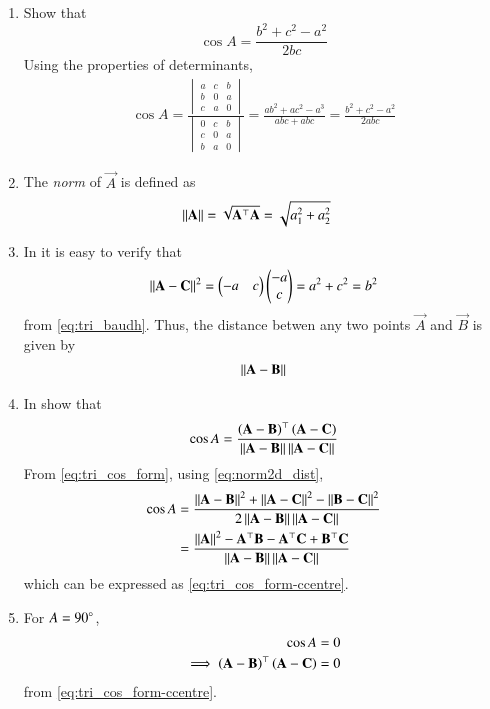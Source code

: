 \begin{enumerate}[label=\thesection.\arabic*.,ref=\thesection.\theenumi]
\item Show that 
\begin{equation}
\label{eq:tri_cos_form}
\cos A = \frac{b^2+c^2-a^2}{2bc}
\end{equation}
%
\solution 
Using the properties of determinants,
%
\begin{align}
\cos A = \frac{
\begin{vmatrix}
a & c & b \\
b & 0 & a \\
c & a & 0
\end{vmatrix}
	}
	{
\begin{vmatrix}
0 & c & b \\
c & 0 & a \\
b & a & 0
\end{vmatrix}
	}
	=\frac{ab^2 + ac^2 - a^3}{abc + abc} 
= \frac{b^2 + c^2 - a^2}{2abc}
\end{align}
\item The {\em norm} of $\vec{A}$ is defined as
\begin{align}
  \label{eq:norm2d}
	\left\lVert\mathbf{A}\right\rVert 
  &= \sqrt{\mathbf{A}^{\top} \mathbf{A}}= \sqrt{a_1^2+a_2^2}
\end{align}
\item In 
it is easy to verify that 
\begin{align}
\left\lVert\mathbf{A}-\mathbf{C}\right\rVert^2  
  = \begin{pmatrix}-a & c\end{pmatrix} \begin{pmatrix}-a \\ c\end{pmatrix}
= a^2 + c^2 = b^2
\end{align}
from 
	\eqref{eq:tri_baudh}.
Thus, 
	the distance betwen any two  points $\vec{A}$ and $\vec{B}$ is given by 
\begin{align}
  \label{eq:norm2d_dist}
\left\lVert\mathbf{A}-\mathbf{B}\right\rVert 
\end{align}
  \item In 
	show that 
\begin{equation}
	\cos A= 	\frac{\left(\mathbf{A}-
	\mathbf{B}\right)^{\top}\left(\mathbf{A}-\mathbf{C}\right)}{\left\lVert\mathbf{A}-\mathbf{B}\right\rVert\left\lVert\mathbf{A}-\mathbf{C}\right\rVert}
\label{eq:tri_cos_form-ccentre}
\end{equation}
\solution
From 
\eqref{eq:tri_cos_form}, using 
  \eqref{eq:norm2d_dist},
\begin{align}
\label{eq:tri_cos_form-ccentre-norm}
	\cos A&= 	\frac{\left\lVert\mathbf{A}-\mathbf{B}\right\rVert^2+\left\lVert\mathbf{A}-\mathbf{C}\right\rVert^2-\left\lVert\mathbf{B}-\mathbf{C}\right\rVert^2}{2\left\lVert\mathbf{A}-\mathbf{B}\right\rVert\left\lVert\mathbf{A}-\mathbf{C}\right\rVert}
	\\
	&= 	\frac{\left\lVert\mathbf{A}\right\rVert^2-\mathbf{A}^{\top}\mathbf{B}-\mathbf{A}^{\top}\mathbf{C}+\mathbf{B}^{\top}\mathbf{C}}{\left\lVert\mathbf{A}-\mathbf{B}\right\rVert\left\lVert\mathbf{A}-\mathbf{C}\right\rVert}
\end{align}
which can be expressed as 
\eqref{eq:tri_cos_form-ccentre}.
\item For $A = 90 \degree$, 
\begin{align}
	\cos A&= 0
	\\
	\implies 
 	\left(\mathbf{A}-
	\mathbf{B}\right)^{\top}\left(\mathbf{A}-\mathbf{C}\right) &=0
\label{eq:tri_cos_form-orth}
\end{align}
from 
\eqref{eq:tri_cos_form-ccentre}.
\end{enumerate}
